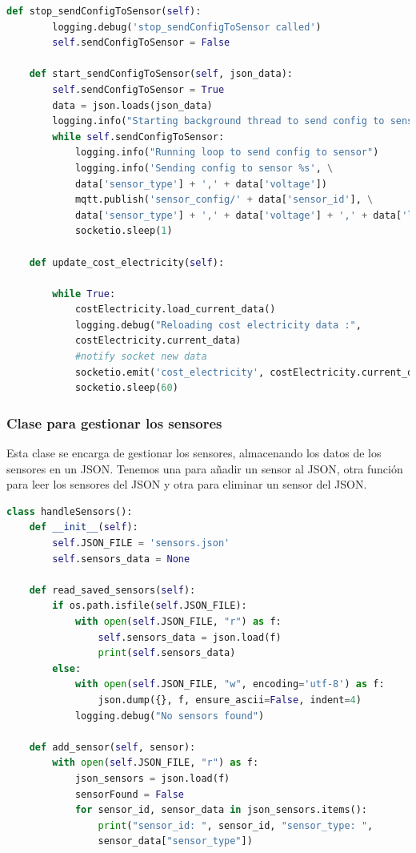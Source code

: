 \begin{titlepage}
\begin{lstlisting}[language=python]
    def stop_sendConfigToSensor(self):
        logging.debug('stop_sendConfigToSensor called')
        self.sendConfigToSensor = False

    def start_sendConfigToSensor(self, json_data):
        self.sendConfigToSensor = True
        data = json.loads(json_data)
        logging.info("Starting background thread to send config to sensor")
        while self.sendConfigToSensor:
            logging.info("Running loop to send config to sensor")
            logging.info('Sending config to sensor %s', \
			data['sensor_type'] + ',' + data['voltage'])
            mqtt.publish('sensor_config/' + data['sensor_id'], \
            data['sensor_type'] + ',' + data['voltage'] + ',' + data['load_type'])
            socketio.sleep(1)
    
    def update_cost_electricity(self):
        
        while True:
            costElectricity.load_current_data()
            logging.debug("Reloading cost electricity data :", 
			costElectricity.current_data)
            #notify socket new data
            socketio.emit('cost_electricity', costElectricity.current_data)
            socketio.sleep(60)
\end{lstlisting}

\subsubsection{Clase para gestionar los sensores}
Esta clase se encarga de gestionar los sensores, almacenando los datos de los sensores en un JSON. Tenemos una para añadir un sensor al JSON, otra función para leer los sensores del JSON y otra para eliminar un sensor del JSON.\\

\begin{lstlisting}[language=python]
class handleSensors():
    def __init__(self):
        self.JSON_FILE = 'sensors.json'
        self.sensors_data = None
    
    def read_saved_sensors(self):
        if os.path.isfile(self.JSON_FILE):
            with open(self.JSON_FILE, "r") as f:
                self.sensors_data = json.load(f)
                print(self.sensors_data)
        else:
            with open(self.JSON_FILE, "w", encoding='utf-8') as f:
                json.dump({}, f, ensure_ascii=False, indent=4)
            logging.debug("No sensors found")

    def add_sensor(self, sensor):
        with open(self.JSON_FILE, "r") as f:
            json_sensors = json.load(f)
            sensorFound = False
            for sensor_id, sensor_data in json_sensors.items():
                print("sensor_id: ", sensor_id, "sensor_type: ", 
				sensor_data["sensor_type"])


\end{lstlisting}
\end{titlepage}
